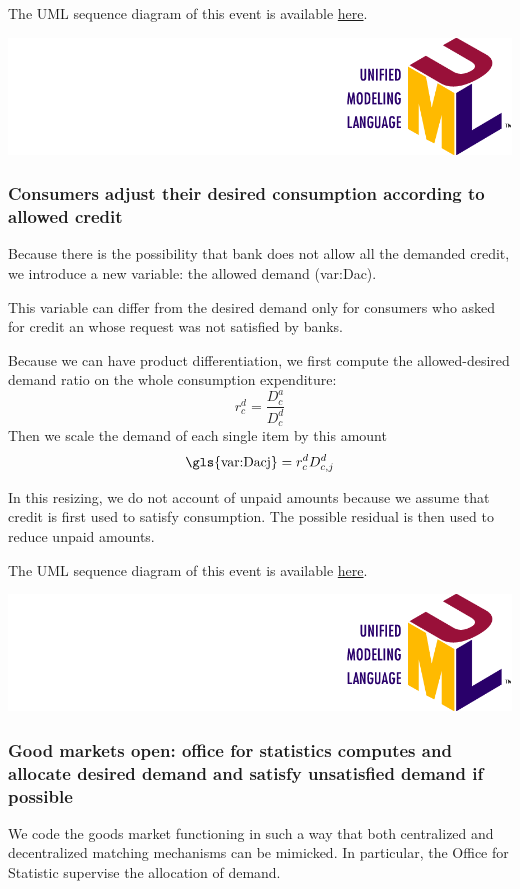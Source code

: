 \documentclass{book}
\newcommand{\doclocation}{file:///Users/giulioni/Documents/workspace/gabriele/docs}
\begin{document}
\vskip3mm
The UML sequence diagram of this event is available \href{\doclocation/umldoc/setAllowedConsumersCredit.html}{here}.
\begin{marginfigure}
	\includegraphics[scale=0.1]{uml.png}
\end{marginfigure}

\subsubsection{Consumers adjust their desired consumption according to allowed credit} 

Because there is the possibility that bank does not allow all the demanded credit, we introduce a new variable: the allowed demand (\gls{var:Dac}). 

This variable can differ from the desired demand only for consumers who asked for credit an whose request was not satisfied by banks.

Because we can have product differentiation, we first compute the allowed-desired demand ratio on the whole consumption expenditure:
\[
	r_{c}^d=\frac{D^a_c}{D^d_c}
\]
Then we scale the demand of each single item by this amount
\[
	\textnormal{\gls{var:Dacj}} =r_{c}^dD_{c,j}^d
\]

In this resizing, we do not account of unpaid amounts because we assume that credit is first used to satisfy consumption. The possible residual is then used to reduce unpaid amounts. 

The UML sequence diagram of this event is available \href{\doclocation/umldoc/adjustConsumptionAccordingToExtendedCredit.html}{here}.
\begin{marginfigure}
	\includegraphics[scale=0.1]{uml.png}
\end{marginfigure}

\subsubsection{Good markets open: office for statistics computes and allocate desired demand and satisfy unsatisfied demand if possible}
We code the goods market functioning in such a way that both centralized and decentralized matching mechanisms can be mimicked. 
In particular, the Office for Statistic supervise the allocation of demand.
\end{document}
